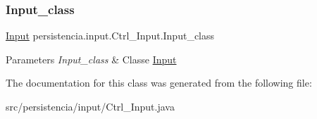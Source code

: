 \subsubsection{\texorpdfstring{Input\+\_\+class}{Input\_class}}
{\footnotesize\ttfamily \hyperlink{classpersistencia_1_1input_1_1Input}{Input} persistencia.\+input.\+Ctrl\+\_\+\+Input.\+Input\+\_\+class\hspace{0.3cm}{\ttfamily [protected]}}


\begin{DoxyParams}{Parameters}
{\em Input\+\_\+class} & Classe \hyperlink{classpersistencia_1_1input_1_1Input}{Input} \\
\hline
\end{DoxyParams}


The documentation for this class was generated from the following file\+:\begin{DoxyCompactItemize}
\item 
src/persistencia/input/Ctrl\+\_\+\+Input.\+java\end{DoxyCompactItemize}
